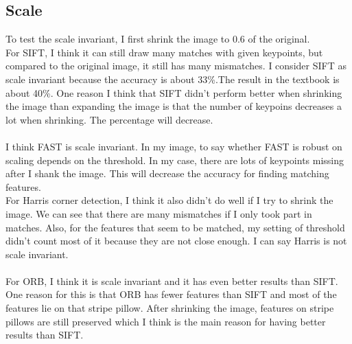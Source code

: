 \documentclass{article}
\begin{document}
\subsection*{Scale}
To test the scale invariant, I first shrink the image to 0.6 of the original.\\
For SIFT, I think it can still draw many matches with given keypoints, but compared to the original image, it still has many mismatches.
I consider SIFT as scale invariant because the accuracy is about 33\%.The result in the textbook is about 40\%.
One reason I think that SIFT didn't perform better when shrinking the image than expanding the image is that the number of keypoins decreases a lot when shrinking.
The percentage will decrease.\\
\\
I think FAST is scale invariant.
In my image, to say whether FAST is robust on scaling depends on the threshold.
In my case, there are lots of keypoints missing after I shank the image.
This will decrease the accuracy for finding matching features.
\\
For Harris corner detection, I think it also didn't do well if I try to shrink the image.
We can see that there are many mismatches if I only took part in matches.
Also, for the features that seem to be matched, my setting of threshold didn't count most of it because they are not close enough.
I can say Harris is not scale invariant.\\
\\
For ORB, I think it is scale invariant and it has even better results than SIFT.
One reason for this is that ORB has fewer features than SIFT and most of the features lie on that stripe pillow.
After shrinking the image, features on stripe pillows are still preserved which I think is the main reason for having better results than SIFT.
\end{document}
